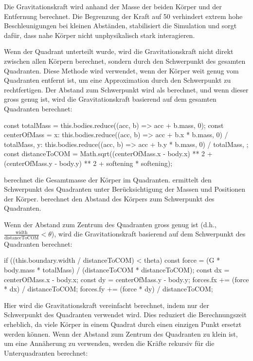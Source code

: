 \documentclass[a4paper,12pt,twoside]{article}
\begin{document}
Die Gravitationskraft  wird anhand der Masse der beiden Körper 
und der Entfernung berechnet.
Die Begrenzung der Kraft auf 50 verhindert extrem hohe Beschleunigungen bei kleinen 
Abständen, stabilisiert die Simulation und sorgt dafür, dass nahe Körper nicht 
unphysikalisch stark interagieren.


Wenn der Quadrant unterteilt wurde, wird die Gravitationskraft nicht direkt zwischen 
allen Körpern berechnet, sondern durch den Schwerpunkt des gesamten Quadranten. 
Diese Methode wird verwendet, wenn der Körper weit genug vom Quadranten entfernt ist, 
um eine Approximation durch den Schwerpunkt zu rechtfertigen. 
Der Abstand zum Schwerpunkt wird als  berechnet, 
und wenn dieser gross genug ist, wird die Gravitationskraft basierend auf dem gesamten 
Quadranten berechnet:

\begin{javascript}
const totalMass = this.bodies.reduce((acc, b) => acc + b.mass, 0);
const centerOfMass = {
  x: this.bodies.reduce((acc, b) => acc + b.x * b.mass, 0) / totalMass,
  y: this.bodies.reduce((acc, b) => acc + b.y * b.mass, 0) / totalMass,
};
const distanceToCOM = Math.sqrt((centerOfMass.x - body.x) ** 2 + (centerOfMass.y - body.y) ** 2 + softening * softening);
\end{javascript}

 berechnet die Gesamtmasse der Körper im Quadranten.
 ermittelt den Schwerpunkt des Quadranten unter 
Berücksichtigung der Massen und Positionen der Körper.
 berechnet den Abstand des Körpers zum Schwerpunkt 
des Quadranten.

Wenn der Abstand zum Zentrum des Quadranten gross genug 
ist (d.h., \( \frac{\text{width}}{\text{distanceToCOM}} < \theta \)), 
wird die Gravitationskraft basierend auf dem Schwerpunkt des Quadranten berechnet:

\begin{javascript}
if ((this.boundary.width / distanceToCOM) < theta) {
    const force = (G * body.mass * totalMass) / (distanceToCOM * distanceToCOM);
    const dx = centerOfMass.x - body.x;
    const dy = centerOfMass.y - body.y;
    forces.fx += (force * dx) / distanceToCOM;
    forces.fy += (force * dy) / distanceToCOM;
}
\end{javascript}

Hier wird die Gravitationskraft vereinfacht berechnet, indem nur der Schwerpunkt 
des Quadranten verwendet wird. Dies reduziert die Berechnungszeit erheblich, 
da viele Körper in einem Quadrat durch einen einzigen Punkt ersetzt werden können.
Wenn der Abstand zum Zentrum des Quadranten zu klein ist, um eine Annäherung zu 
verwenden, werden die Kräfte rekursiv für die Unterquadranten berechnet:
\end{document}
